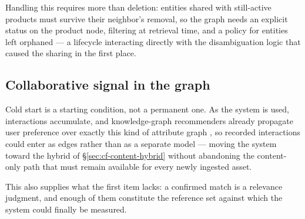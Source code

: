 Handling this requires more than deletion: entities shared with still-active products must survive their neighbor's removal, so the graph needs an explicit status on the product node, filtering at retrieval time, and a policy for entities left orphaned — a lifecycle interacting directly with the disambiguation logic that caused the sharing in the first place.

\subsection{Collaborative signal in the graph}

Cold start is a starting condition, not a permanent one. As the system is used, interactions accumulate, and knowledge-graph recommenders already propagate user preference over exactly this kind of attribute graph \citep{wang2019kgat,guo2022survey}, so recorded interactions could enter as edges rather than as a separate model — moving the system toward the hybrid of \S\ref{sec:cf-content-hybrid} \citep{burke2002hybrid} without abandoning the content-only path that must remain available for every newly ingested asset. 


This also supplies what the first item lacks: a confirmed match is a relevance judgment, and enough of them constitute the reference set against which the system could finally be measured.
